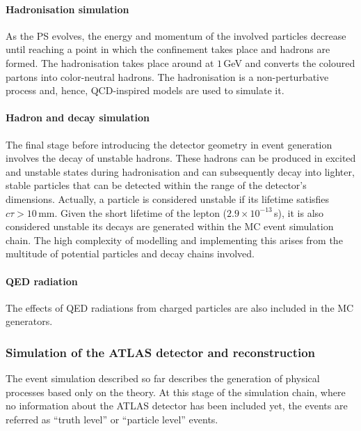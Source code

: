\paragraph{Hadronisation simulation}\mbox{}

As the PS evolves, the energy and momentum of the involved
particles decrease until reaching a point in which the confinement
takes place and hadrons are formed. The hadronisation takes place
around at $1\,$GeV and converts the coloured partons into color-neutral
hadrons. The hadronisation is a non-perturbative process and, hence, 
QCD-inspired models are used to simulate it.

\paragraph{Hadron and \Ptau decay simulation}\mbox{}

The final stage before introducing the detector geometry in event generation involves the decay of unstable hadrons. 
These hadrons can be produced in excited and unstable states during hadronisation 
and can subsequently decay into lighter, stable particles that can be detected within 
the range of the detector's dimensions. Actually, a particle is considered unstable if 
its lifetime satisfies $c\tau > 10\,$mm. Given the short lifetime of the \Ptau lepton 
($2.9 \times 10^{-13}\,$s), it is also considered unstable  its decays are generated 
within the MC event simulation chain. The high complexity of modelling and implementing 
this arises from the multitude of potential particles and decay chains involved.

\paragraph{QED radiation}\mbox{}

The effects of QED radiations from charged particles are also included in the MC generators.

\subsubsection{Simulation of the ATLAS detector and  reconstruction}
The event simulation described so far describes the generation of physical 
processes based only on the theory. At this stage of the simulation chain, 
where no information about the ATLAS detector has been included yet, the
events are referred as ``truth level'' or ``particle level'' events.

